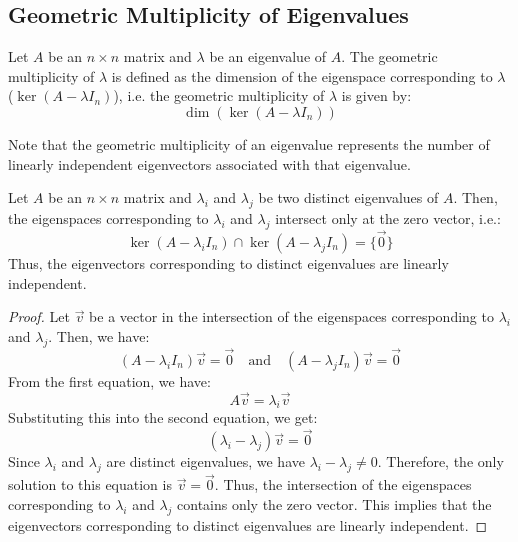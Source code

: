 
\subsection{Geometric Multiplicity of Eigenvalues}
\begin{definition}
    Let $A$ be an $n \times n$ matrix and $\lambda$ be an eigenvalue of $A$. The geometric multiplicity of $\lambda$ is defined as the dimension of the eigenspace corresponding to $\lambda$ ($\ker(A - \lambda I_n)$), i.e. the geometric multiplicity of $\lambda$ is given by:
    \[
        \dim(\ker(A - \lambda I_n))
    \]
\end{definition}
Note that the geometric multiplicity of an eigenvalue represents the number of linearly independent eigenvectors associated with that eigenvalue.

\begin{theorem}
    Let $A$ be an $n \times n$ matrix and $\lambda_i$ and $\lambda_j$ be two distinct eigenvalues of $A$. Then, the eigenspaces corresponding to $\lambda_i$ and $\lambda_j$ intersect only at the zero vector, i.e.:
    \[\ker(A - \lambda_i I_n) \cap \ker(A - \lambda_j I_n) = \{\vec{0}\}\]
    Thus, the eigenvectors corresponding to distinct eigenvalues are linearly independent.
\end{theorem}
\begin{proof}
    Let $\vec{v}$ be a vector in the intersection of the eigenspaces corresponding to $\lambda_i$ and $\lambda_j$. Then, we have:
    \[(A - \lambda_i I_n) \vec{v} = \vec{0} \quad \text{and} \quad (A - \lambda_j I_n) \vec{v} = \vec{0}\]
    From the first equation, we have:
    \[A \vec{v} = \lambda_i \vec{v}\]
    Substituting this into the second equation, we get:
    \[(\lambda_i - \lambda_j) \vec{v} = \vec{0}\]
    Since $\lambda_i$ and $\lambda_j$ are distinct eigenvalues, we have $\lambda_i - \lambda_j \neq 0$. Therefore, the only solution to this equation is $\vec{v} = \vec{0}$. Thus, the intersection of the eigenspaces corresponding to $\lambda_i$ and $\lambda_j$ contains only the zero vector. This implies that the eigenvectors corresponding to distinct eigenvalues are linearly independent.
\end{proof}

